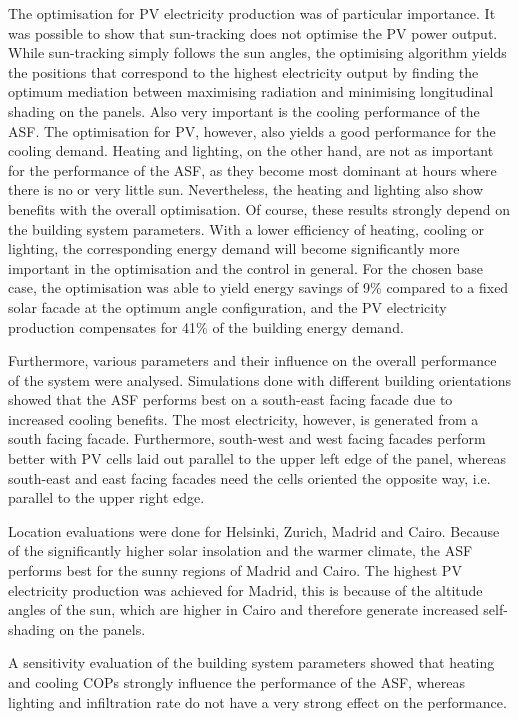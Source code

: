 The optimisation for PV electricity production was of particular importance. It was possible to show that sun-tracking does not optimise the PV power output. While sun-tracking simply follows the sun angles, the optimising algorithm yields the positions that correspond to the highest electricity output by finding the optimum mediation between maximising radiation and minimising longitudinal shading on the panels. Also very important is the cooling performance of the ASF. The optimisation for PV, however, also yields a good performance for the cooling demand. Heating and lighting, on the other hand, are not as important for the performance of the ASF, as they become most dominant at hours where there is no or very little sun. Nevertheless, the heating and lighting also show benefits with the overall optimisation. Of course, these results strongly depend on the building system parameters. With a lower efficiency of heating, cooling or lighting, the corresponding energy demand will become significantly more important in the optimisation and the control in general. For the chosen base case, the optimisation was able to yield energy savings of 9\% compared to a fixed solar facade at the optimum angle configuration, and the PV electricity production compensates for 41\% of the building energy demand. 

Furthermore, various parameters and their influence on the overall performance of the system were analysed. Simulations done with different building orientations showed that the ASF performs best on a south-east facing facade due to increased cooling benefits. The most electricity, however, is generated from a south facing facade. Furthermore, south-west and west facing facades perform better with PV cells laid out parallel to the upper left edge of the panel, whereas south-east and east facing facades need the cells oriented the opposite way, i.e. parallel to the upper right edge. 

Location evaluations were done for Helsinki, Zurich, Madrid and Cairo. Because of the significantly higher solar insolation and the warmer climate, the ASF performs best for the sunny regions of Madrid and Cairo. The highest PV electricity production was achieved for Madrid, this is because of the altitude angles of the sun, which are higher in Cairo and therefore generate increased self-shading on the panels. 

A sensitivity evaluation of the building system parameters showed that heating and cooling COPs strongly influence the performance of the ASF, whereas lighting and infiltration rate do not have a very strong effect on the performance. 


